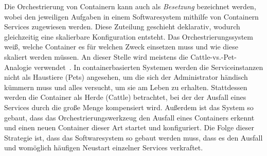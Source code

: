 Die Orchestrierung von Containern kann auch als \emph{Besetzung} bezeichnet werden, wobei den jeweiligen Aufgaben in einem Softwaresystem mithilfe von Containern Services zugewiesen werden.
Diese Zuteilung geschieht deklarativ, wodurch gleichzeitig eine skalierbare Konfiguration entsteht.
Das Orchestrierungssystem weiß, welche Container es für welchen Zweck einsetzen muss und wie diese skaliert werden müssen. An dieser Stelle wird meistens die Cattle-vs.-Pet-Analogie verwendet~\autocite{pets-vs-cattle:online}.
In containerbasierten Systemen werden die Serviceinstanzen nicht als Haustiere (Pets) angesehen, um die sich der Administrator händisch kümmern muss und alles versucht, um sie am Leben zu erhalten.
Stattdessen werden die Container als Herde (Cattle) betrachtet, bei der der Ausfall eines Services durch die große Menge kompensiert wird.
Außerdem ist das System so gebaut, dass das Orchestrierungswerkzeug den Ausfall eines Containers erkennt und einen neuen Container dieser Art startet und konfiguriert.
Die Folge dieser Strategie ist, dass das Softwaresystem so gebaut werden muss, dass es den Ausfall und womöglich häufigen Neustart einzelner Services verkraftet.

